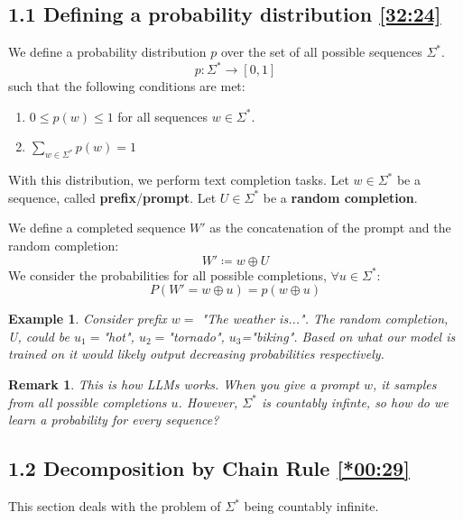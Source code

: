 \documentclass[12pt, twoside]{article}
\theoremstyle{spaceddefn}
\newtheorem{remark}{Remark}[section]
\newtheorem{example}{Example}[section]
\begin{document}
\subsection*{1.1 Defining a probability distribution \href{https://youtu.be/3bG2Dy7Du0Y?si=g2tHZbM3oEpgRSpv&t=1944}{[32:24]}}

We define a probability distribution $p$ over the set of all possible sequences $\Sigma^*$.
\[ p: \Sigma^* \to [0, 1] \]
such that the following conditions are met:
\begin{enumerate}
    \item $0 \le p(w) \le 1$ for all sequences $w \in \Sigma^*$.
    \item $ \sum_{w \in \Sigma^*} p(w) = 1 $
\end{enumerate}


With this distribution, we perform text completion tasks. Let $w \in \Sigma^*$ be a sequence, called \textbf{prefix}/\textbf{prompt}. Let $U \in \Sigma^*$ be a \textbf{random completion}.

We define a completed sequence $W'$ as the concatenation of the prompt and the random completion:
\[ W' \coloneqq w \oplus U \]
We consider the probabilities for all possible completions, $\forall u \in \Sigma^*$:
\[ P(W' = w \oplus u) = p(w \oplus u) \]

\begin{example}
    Consider prefix $w =$ "The weather is...". The random completion, U, could be $u_1=$"hot", $u_2=$"tornado", $u_3$="biking". Based on what our model is trained on it would likely output decreasing probabilities respectively.
\end{example}

\begin{remark}
This is how LLMs works. When you give a prompt $w$, it samples from all possible completions $u$. However, $\Sigma^*$ is countably infinte, so how do we learn a probability for every sequence?
\end{remark}

\subsection*{1.2 Decomposition by Chain Rule \href{https://youtu.be/DR8bQPoRlX8?si=4XI5qRSxxBxY80oO&t=29}{[*00:29]}}

This section deals with the problem of $\Sigma^*$ being countably infinite.
\end{document}
